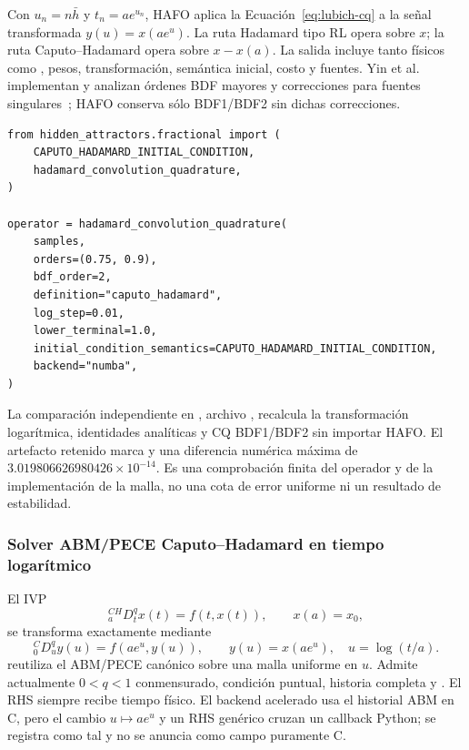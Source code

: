 Con \(u_n=n\bar h\) y \(t_n=ae^{u_n}\), HAFO aplica la
Ecuación~\eqref{eq:lubich-cq} a la señal transformada \(y(u)=x(ae^u)\). La ruta
Hadamard tipo RL opera sobre \(x\); la ruta Caputo--Hadamard opera sobre
\(x-x(a)\). La salida incluye tanto  físicos como
, pesos, transformación, semántica inicial, costo y fuentes.
Yin et al. implementan y analizan órdenes BDF mayores y correcciones para
fuentes singulares~\cite{YinEtAl2024}; HAFO conserva sólo BDF1/BDF2 sin dichas
correcciones.

\begin{verbatim}
from hidden_attractors.fractional import (
    CAPUTO_HADAMARD_INITIAL_CONDITION,
    hadamard_convolution_quadrature,
)

operator = hadamard_convolution_quadrature(
    samples,
    orders=(0.75, 0.9),
    bdf_order=2,
    definition="caputo_hadamard",
    log_step=0.01,
    lower_terminal=1.0,
    initial_condition_semantics=CAPUTO_HADAMARD_INITIAL_CONDITION,
    backend="numba",
)
\end{verbatim}

La comparación independiente en
, archivo
, recalcula la transformación
logarítmica, identidades analíticas y CQ
BDF1/BDF2 sin importar HAFO. El artefacto retenido marca
 y una diferencia numérica máxima de
\(3.019806626980426\times10^{-14}\). Es una comprobación finita del operador y
de la implementación de la malla, no una cota de error uniforme ni un
resultado de estabilidad.

\subsubsection{Solver ABM/PECE Caputo--Hadamard en tiempo logarítmico}

El IVP
\[
 {}_a^{CH}D_t^q x(t)=f(t,x(t)),\qquad x(a)=x_0,
\]
se transforma exactamente mediante~\cite{Zheng2021}
\[
 {}_0^CD_u^q y(u)=f(ae^u,y(u)),
 \qquad y(u)=x(ae^u),\quad u=\log(t/a).
\]
 reutiliza el ABM/PECE canónico sobre
una malla uniforme en \(u\). Admite actualmente \(0<q<1\) conmensurado,
condición puntual, historia completa y . El RHS siempre
recibe tiempo físico. El backend acelerado usa el historial ABM en C, pero el
cambio \(u\mapsto ae^u\) y un RHS genérico cruzan un callback Python; se registra
como tal y no se anuncia como campo puramente C.

